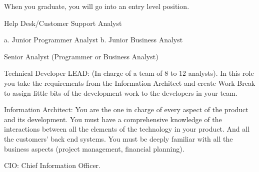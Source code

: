 When you graduate, you will go into an entry level position.

Help Desk/Customer Support Analyst

a. Junior Programmer Analyst
b. Junior Business Analyst

Senior Analyst (Programmer or Business Analyst)

Technical Developer LEAD: (In charge of a team of 8 to 12 analysts). In this role you take the requirements from the Information Architect and create Work Break to assign little bits of the development work to the developers in your team.

Information Architect: 
You are the one in charge of every aspect of the product and its development.
You must have a comprehensive knowledge of the interactions between all the elements of the technology in your product. And all the customers' back end systems. You must be deeply familiar with all the business aspects (project management, financial planning).

CIO: Chief Information Officer.